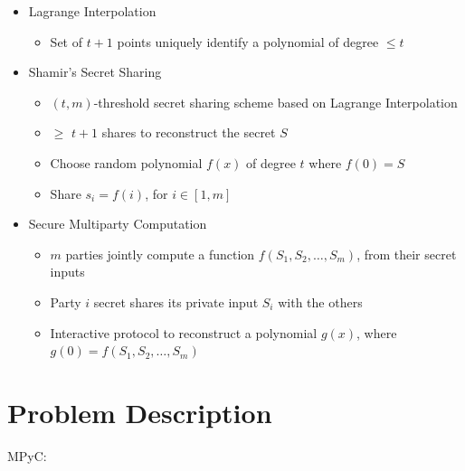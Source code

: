 \begin{itemize}
\tightlist
\item
  Lagrange Interpolation

  \begin{itemize}
  \tightlist
  \item
    Set of \(t+1\) points uniquely identify a polynomial of degree
    \(\leq t\)
  \end{itemize}
\item
  Shamir's Secret Sharing

  \begin{itemize}
  \tightlist
  \item
    \((t, m)\)-threshold secret sharing scheme based on Lagrange
    Interpolation
  \item
    \(\geq\) \(t+1\) shares to reconstruct the secret \(S\)
  \item
    Choose random polynomial \(f(x)\) of degree \(t\) where \(f(0) = S\)
  \item
    Share \(s_i = f(i)\), for \(i \in [1,m]\)
  \end{itemize}
\item
  Secure Multiparty Computation

  \begin{itemize}
  \tightlist
  \item
    \(m\) parties jointly compute a function
    \(f(S_{1},S_{2},\dots,S_{m})\), from their secret inputs
  \item
    Party \(i\) secret shares its private input \(S_{i}\) with the
    others
  \item
    Interactive protocol to reconstruct a polynomial \(g(x)\), where
    \(g(0)=f(S_1, S_2, \dots, S_m)\)
  \end{itemize}
\end{itemize}

\hypertarget{problem-description}{%
\part{Problem Description}\label{problem-description}}

MPyC:

